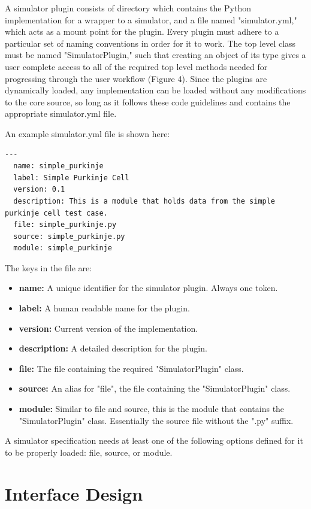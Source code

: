 \documentclass[12pt]{article}
\begin{document}
	A simulator plugin consists of directory which contains the Python implementation for a wrapper to a simulator, and a file named "simulator.yml," which acts as a mount point for the plugin. Every plugin must adhere to a particular set of naming conventions in order for it to work. The top level class must be named "SimulatorPlugin," such that creating an object of its type gives a user complete access to all of the required top level methods needed for progressing through the user workflow (Figure 4). Since the plugins are dynamically loaded, any implementation can be loaded without any modifications to the core source, so long as it follows these code guidelines and contains the appropriate simulator.yml file.
	
An example simulator.yml file is shown here:

\begin{verbatim}
---
  name: simple_purkinje
  label: Simple Purkinje Cell
  version: 0.1
  description: This is a module that holds data from the simple purkinje cell test case.
  file: simple_purkinje.py
  source: simple_purkinje.py
  module: simple_purkinje
\end{verbatim}

The keys in the file are:

\begin{itemize}
\item[] {\bf name:} A unique identifier for the simulator plugin. Always one token.
\item[] {\bf label:} A human readable name for the plugin.
\item[] {\bf version:} Current version of the implementation.
\item[] {\bf description:} A detailed description for the plugin. 
\item[] {\bf file:} The file containing the required "SimulatorPlugin" class.
\item[] {\bf source:} An alias for "file", the file containing the "SimulatorPlugin" class.
\item[] {\bf module:} Similar to file and source, this is the module that contains the "SimulatorPlugin" class. Essentially the source file without the ".py" suffix.
\end{itemize}

A simulator specification needs at least one of the following options defined for it to be properly loaded: file, source, or module.

\section*{Interface Design}
\end{document}
